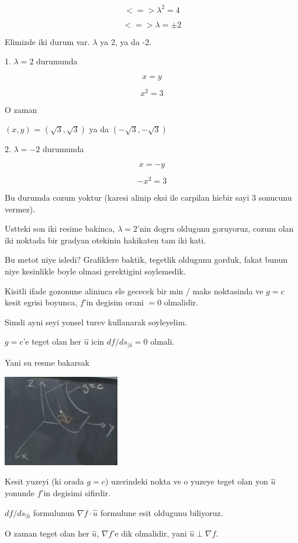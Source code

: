 \documentclass[12pt,fleqn]{article}
\begin{document}
\[ <=> \lambda^2 = 4 \]

\[ <=> \lambda = \pm 2 \]

Elimizde iki durum var. $\lambda$ ya 2, ya da -2. 

1. $\lambda = 2$ durumunda

\[ x = y \]

\[ x^2 = 3 \]

O zaman

$(x,y)$ = $(\sqrt{3}, \sqrt{3})$ ya da $(-\sqrt{3}, -\sqrt{3})$ 

2. $\lambda = -2$ durumunda

\[ x = -y \]

\[ -x^2 = 3 \]

Bu durumda cozum yoktur (karesi alinip eksi ile carpilan hicbir sayi 3
sonucunu vermez). 

Ustteki son iki resime bakinca, $\lambda = 2$'nin dogru oldugunu goruyoruz,
cozum olan iki noktada bir gradyan otekinin hakikaten tam iki kati. 

Bu metot niye isledi? Grafiklere baktik, tegetlik oldugunu gorduk, fakat
bunun niye kesinlikle boyle olmasi gerektigini soylemedik. 

Kisitli ifade gozonune alininca ele gececek bir min / maks noktasinda ve
$g = c$ kesit egrisi boyunca, $f$'in degisim orani $=0$ olmalidir.

Simdi ayni seyi yonsel turev kullanarak soyleyelim. 

$g=c$'e teget olan her $\hat{u}$ icin $df / ds_{|\hat{u}} = 0$ olmali. 

Yani su resme bakarsak

\includegraphics[height=4cm]{13_7.png}

Kesit yuzeyi (ki orada $g=c$) uzerindeki nokta ve o yuzeye teget olan yon
$\hat{u}$ yonunde $f$'in degisimi sifirdir. 

$df / ds_{|\hat{u}}$ formulunun $\nabla f \cdot \hat{u}$ formulune esit oldugunu  biliyoruz. 

O zaman teget olan her $\hat{u}$, $\nabla f$'e dik olmalidir, yani $\hat{u} \perp \nabla f$. 
\end{document}
